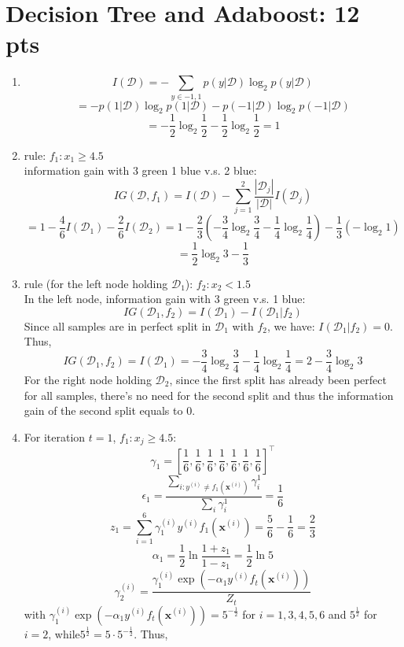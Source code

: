 \documentclass[12pt]{article}
\begin{document}
\section{Decision Tree and Adaboost: 12 pts}
\begin{enumerate}
    \item \[I(\mathcal{D}) = - \sum_{y\in{-1,1}}p(y|\mathcal{D})\log_2 p(y|\mathcal{D})\]
    \[= -p(1|\mathcal{D})\log_2p(1|\mathcal{D}) -p(-1|\mathcal{D})\log_2p(-1|\mathcal{D})\]
    \[= -\frac{1}{2}\log_2\frac{1}{2} - \frac{1}{2}\log_2\frac{1}{2} = 1\]
    \item rule: $f_1: x_1\geq4.5$\\
    information gain with 3 green 1 blue v.s. 2 blue:
    \[IG(\mathcal{D},f_1) = I(\mathcal{D}) - \sum_{j=1}^{2}\frac{|\mathcal{D}_j|}{|\mathcal{D}|}I(\mathcal{D}_j)\]
    \[= 1 - \frac{4}{6}I(\mathcal{D}_1) - \frac{2}{6}I(\mathcal{D}_2)
    = 1 - \frac{2}{3}(-\frac{3}{4}\log_2\frac{3}{4} - \frac{1}{4}\log_2\frac{1}{4}) - \frac{1}{3}(-\log_2 1)\]
    \[= \frac{1}{2}\log_2 3 - \frac{1}{3}\]
    \item rule (for the left node holding $\mathcal{D}_1$):
    $f_2: x_2<1.5$\\
    In the left node, information gain with 3 green v.s. 1 blue:
    \[IG(\mathcal{D}_1,f_2) = I(\mathcal{D}_1) - I(\mathcal{D}_1|f_2)\] 
    Since all samples are in perfect split in $\mathcal{D}_1$ with $f_2$, we have:
    $I(\mathcal{D}_1|f_2) = 0$. Thus,
    \[IG(\mathcal{D}_1, f_2) = I(\mathcal{D}_1) = -\frac{3}{4}\log_2\frac{3}{4} - \frac{1}{4}\log_2\frac{1}{4} = 2 - \frac{3}{4}\log_2 3\]
    For the right node holding $\mathcal{D}_2$, since the first split has already been perfect for all samples, there's no need for the second split and thus the information gain of the second split equals to 0.
    \item For iteration $t = 1$, $f_1:x_j\geq4.5$:
    \[\gamma_1 = [\frac{1}{6}, \frac{1}{6},\frac{1}{6},\frac{1}{6},\frac{1}{6},\frac{1}{6},\frac{1}{6}]^{\top}\]
    \[\epsilon_1 = \frac{\sum_{i:y^{(i)}\neq f_1(\boldsymbol{x}^{(i)})}\gamma_i^1}{\sum_i\gamma_i^1} = \frac{1}{6}\]
    \[z_1 = \sum_{i=1}^6\gamma_1^{(i)}y^{(i)}f_1(\boldsymbol{x}^{(i)}) = \frac{5}{6} - \frac{1}{6} = \frac{2}{3}\]
    \[\alpha_1 = \frac{1}{2}\ln\frac{1+z_1}{1-z_1} = \frac{1}{2}\ln5\]
    \[\gamma_2^{(i)} = \frac{\gamma_1^{(i)}\exp(-\alpha_1y^{(i)}f_t(\boldsymbol{x}^{(i)}))}{Z_t}\]
    with $\gamma_1^{(i)}\exp(-\alpha_1y^{(i)}f_t(\boldsymbol{x}^{(i)})) = 5^{-\frac{1}{2}}$ for $i = 1, 3, 4, 5, 6$ and $5^{\frac{1}{2}}$ for $i = 2$, while\:$5^{\frac{1}{2}} = 5\cdot5^{-\frac{1}{2}}$. Thus,

\end{enumerate}
\end{document}
